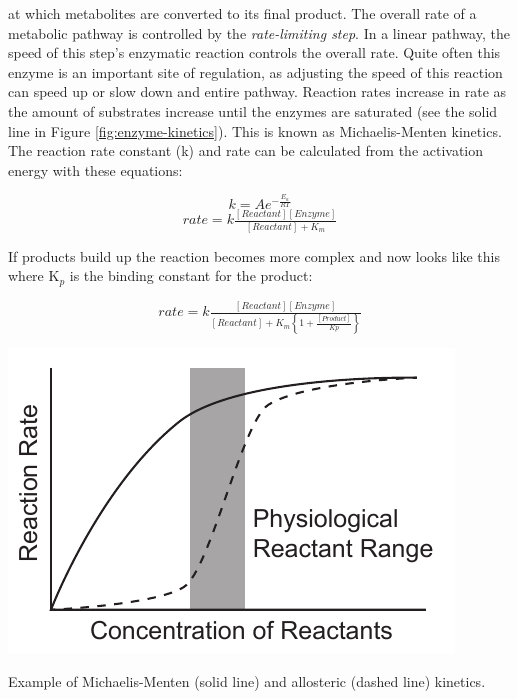 \documentclass{tufte-handout}
\begin{document}
 at which metabolites are converted to its final product. The overall rate of a metabolic pathway is controlled by the \emph{rate-limiting step}.  In a linear pathway, the speed of this step's enzymatic reaction controls the overall rate.  Quite often this enzyme is an important site of regulation, as adjusting the speed of this reaction can speed up or slow down and entire pathway.  Reaction rates increase in rate as the amount of substrates increase until the enzymes are saturated (see the solid line in Figure \ref{fig:enzyme-kinetics}).  This is known as Michaelis-Menten kinetics.  The reaction rate constant (k) and rate can be calculated from the activation energy with these equations:

\begin{equation}
k = A e^{-\frac{E_{a}}{RT}} 
\end{equation}
\begin{equation}
rate = k\tfrac{[Reactant][Enzyme]}{[Reactant] + K_{m}}
\end{equation}

If products build up the reaction becomes more complex and now looks like this where K$_{p}$ is the binding constant for the product:

\begin{equation}
rate = k\tfrac{[Reactant][Enzyme]}{[Reactant] +K_{m}\left \{ 1 + \frac{[Product]}{Kp} \right \}}
\end{equation}

\begin{marginfigure}
\includegraphics[width=\marginparwidth]{figures/enzyme-kinetics.pdf}\
\caption{Example of Michaelis-Menten (solid line) and allosteric (dashed line) kinetics.}
\label{fig:enzyme-kinetics}
\end{marginfigure}
\end{document}

